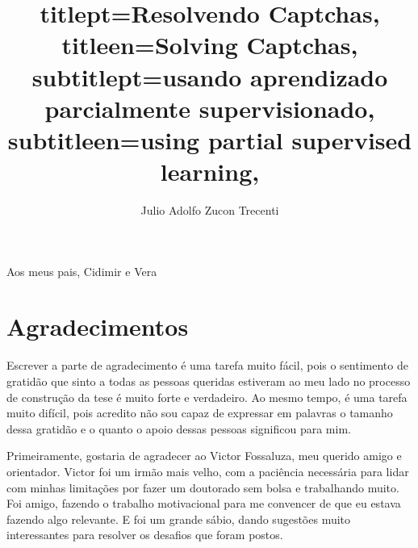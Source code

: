 \documentclass[12pt,twoside,brazilian]{book}
\title{
    titlept={Resolvendo Captchas},
    titleen={Solving Captchas},
    subtitlept={usando aprendizado parcialmente supervisionado},
    subtitleen={using partial supervised learning},
}
\author{Julio Adolfo Zucon Trecenti}
\begin{document}

\frontmatter

\pagestyle{plain}

\onehalfspacing %

\maketitle %


\begin{dedicatoria}
Aos meus pais,
Cidimir e Vera
\end{dedicatoria}


\chapter*{Agradecimentos}

Escrever a parte de agradecimento é uma tarefa muito fácil, pois o sentimento de gratidão que sinto a todas as pessoas queridas estiveram ao meu lado no processo de construção da tese é muito forte e verdadeiro. Ao mesmo tempo, é uma tarefa muito difícil, pois acredito não sou capaz de expressar em palavras o tamanho dessa gratidão e o quanto o apoio dessas pessoas significou para mim.

Primeiramente, gostaria de agradecer ao Victor Fossaluza, meu querido amigo e orientador. Victor foi um irmão mais velho, com a paciência necessária para lidar com minhas limitações por fazer um doutorado sem bolsa e trabalhando muito. Foi amigo, fazendo o trabalho motivacional para me convencer de que eu estava fazendo algo relevante. E foi um grande sábio, dando sugestões muito interessantes para resolver os desafios que foram postos.
\end{document}
